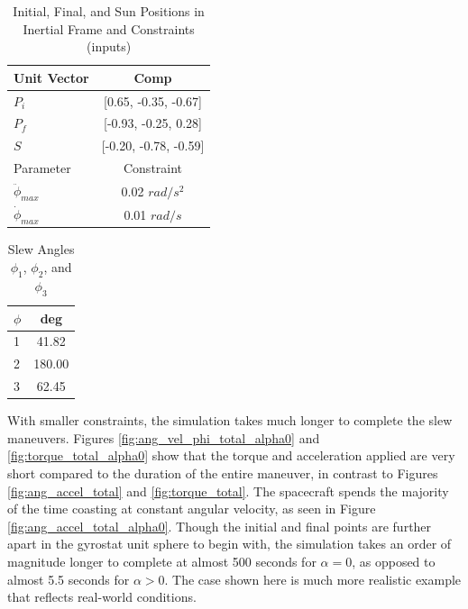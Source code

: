 \documentclass[letterpaper, preprint, paper,11pt]{AAS}	%
\begin{document}
\begin{multicols}{2}
	\begin{center}
		\begin{table}[H]
			\centering
			\caption{Initial, Final, and Sun Positions in Inertial Frame and Constraints (inputs)}
			\begin{tabular}{lc}
				\toprule
				\midrule
				Unit Vector & Comp \\
				\midrule
				$P_i$ & [0.65, -0.35, -0.67] \\
				$P_f$ & [-0.93, -0.25, 0.28] \\ 
				$S$ & [-0.20, -0.78, -0.59] \\
				\midrule
				\midrule
				Parameter & Constraint \\ 
				\midrule
				$\ddot{\phi}_{max}$ & 0.02 $rad/s^2$ \\
				$\dot{\phi}_{max}$ & 0.01 $rad/s$ \\ 
				\midrule
				\bottomrule
			\end{tabular}%
			\label{tab:alpha0_PiPfS_AWmax}%
		\end{table}
	\end{center}
	\columnbreak
	\begin{center}
		\begin{table}[H]
			\centering
			\caption{Slew Angles $\phi_1$, $\phi_2$, and $\phi_3$}
			\begin{tabular}{lc}
				\toprule
				\midrule
				$\phi$ & deg \\
				\midrule
				1 & 41.82 \\
				2 & 180.00 \\ 
				3 & 62.45 \\
				\midrule
				\bottomrule
			\end{tabular}%
			\label{tab:alpha0_phi_123}%
		\end{table}%
	\end{center}
\end{multicols}

With smaller constraints, the simulation takes much longer to complete the slew maneuvers. Figures \ref{fig:ang_vel_phi_total_alpha0} and \ref{fig:torque_total_alpha0} show that the torque and acceleration applied are very short compared to the duration of the entire maneuver, in contrast to Figures \ref{fig:ang_accel_total} and \ref{fig:torque_total}. The spacecraft spends the majority of the time coasting at constant angular velocity, as seen in Figure \ref{fig:ang_accel_total_alpha0}. Though the initial and final points are further apart in the gyrostat unit sphere to begin with, the simulation takes an order of magnitude longer to complete at almost 500 seconds for $\alpha = 0$, as opposed to almost 5.5 seconds for $\alpha > 0$. The case shown here is much more realistic example that reflects real-world conditions. 
\end{document}
